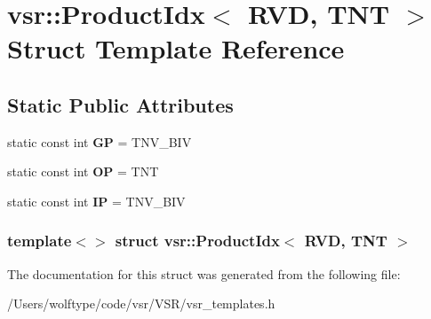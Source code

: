 \hypertarget{structvsr_1_1_product_idx_3_01_r_v_d_00_01_t_n_t_01_4}{\section{vsr\-:\-:Product\-Idx$<$ R\-V\-D, T\-N\-T $>$ Struct Template Reference}
\label{structvsr_1_1_product_idx_3_01_r_v_d_00_01_t_n_t_01_4}
}
\subsection*{Static Public Attributes}
\begin{DoxyCompactItemize}
\item 
\hypertarget{structvsr_1_1_product_idx_3_01_r_v_d_00_01_t_n_t_01_4_a8a3c44e25f4f4d4ce49a2d31f712e859}{static const int {\bfseries G\-P} = T\-N\-V\-\_\-\-B\-I\-V}\label{structvsr_1_1_product_idx_3_01_r_v_d_00_01_t_n_t_01_4_a8a3c44e25f4f4d4ce49a2d31f712e859}

\item 
\hypertarget{structvsr_1_1_product_idx_3_01_r_v_d_00_01_t_n_t_01_4_aa52a55e48f626018964ea25a3f00032d}{static const int {\bfseries O\-P} = T\-N\-T}\label{structvsr_1_1_product_idx_3_01_r_v_d_00_01_t_n_t_01_4_aa52a55e48f626018964ea25a3f00032d}

\item 
\hypertarget{structvsr_1_1_product_idx_3_01_r_v_d_00_01_t_n_t_01_4_ac25fec353257881d999c7e7a2e377e00}{static const int {\bfseries I\-P} = T\-N\-V\-\_\-\-B\-I\-V}\label{structvsr_1_1_product_idx_3_01_r_v_d_00_01_t_n_t_01_4_ac25fec353257881d999c7e7a2e377e00}

\end{DoxyCompactItemize}
\subsubsection*{template$<$$>$ struct vsr\-::\-Product\-Idx$<$ R\-V\-D, T\-N\-T $>$}



The documentation for this struct was generated from the following file\-:\begin{DoxyCompactItemize}
\item 
/\-Users/wolftype/code/vsr/\-V\-S\-R/vsr\-\_\-templates.\-h\end{DoxyCompactItemize}
